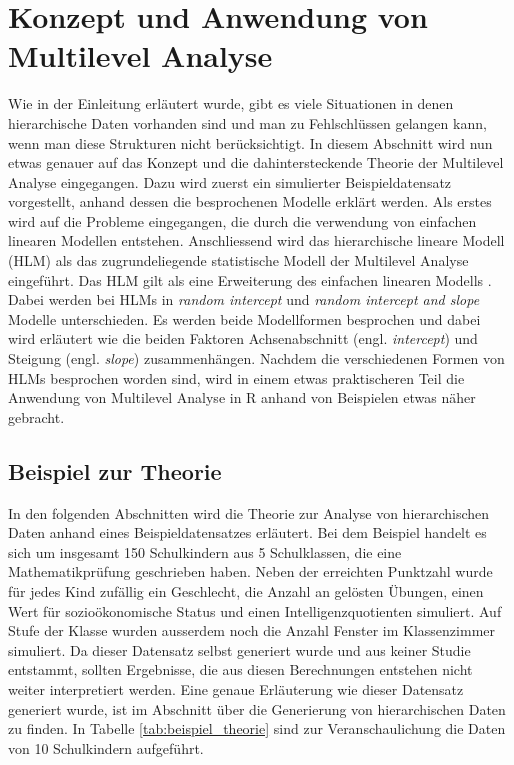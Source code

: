 \documentclass[12pt]{article}\usepackage[]{graphicx}\usepackage[]{color}
\numberwithin{equation}{section}
\begin{document}
\section{Konzept und Anwendung von Multilevel Analyse}
Wie in der Einleitung erläutert wurde, gibt es viele Situationen in denen hierarchische Daten vorhanden sind und man zu Fehlschlüssen gelangen kann, wenn man diese Strukturen nicht berücksichtigt. In diesem Abschnitt wird nun etwas genauer auf das Konzept und die dahintersteckende Theorie der Multilevel Analyse eingegangen. Dazu wird zuerst ein simulierter Beispieldatensatz vorgestellt, anhand dessen die besprochenen Modelle erklärt werden. Als erstes wird auf die Probleme eingegangen, die durch die verwendung von einfachen linearen Modellen entstehen. Anschliessend wird das hierarchische lineare Modell (HLM) als das zugrundeliegende statistische Modell der Multilevel Analyse eingeführt. Das HLM gilt als eine Erweiterung des einfachen linearen Modells \cite{SnijdersTomA.B2012Ma:a}. Dabei werden bei HLMs in \textit{random intercept} und \textit{random intercept and slope} Modelle unterschieden. Es werden beide Modellformen besprochen und dabei wird erläutert wie die beiden Faktoren Achsenabschnitt (engl. \textit{intercept}) und Steigung (engl. \textit{slope}) zusammenhängen. Nachdem die verschiedenen Formen von HLMs besprochen worden sind, wird in einem etwas praktischeren Teil die Anwendung von Multilevel Analyse in R anhand von Beispielen etwas näher gebracht.

\subsection{Beispiel zur Theorie}
In den folgenden Abschnitten wird die Theorie zur Analyse von hierarchischen Daten anhand eines Beispieldatensatzes erläutert. Bei dem Beispiel handelt es sich um insgesamt 150 Schulkindern aus 5 Schulklassen, die eine Mathematikprüfung geschrieben haben. Neben der erreichten Punktzahl wurde für jedes Kind zufällig ein Geschlecht, die Anzahl an gelösten Übungen, einen Wert für sozioökonomische Status und einen Intelligenzquotienten simuliert. Auf Stufe der Klasse wurden ausserdem noch die Anzahl Fenster im Klassenzimmer simuliert. Da dieser Datensatz selbst generiert wurde und aus keiner Studie entstammt, sollten Ergebnisse, die aus diesen Berechnungen entstehen nicht weiter interpretiert werden. Eine genaue Erläuterung wie dieser Datensatz generiert wurde, ist im Abschnitt über die Generierung von hierarchischen Daten zu finden. In Tabelle \ref{tab:beispiel_theorie} sind zur Veranschaulichung die Daten von 10 Schulkindern aufgeführt.
\end{document}
